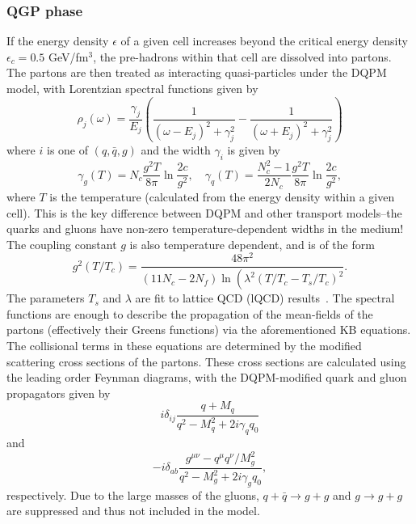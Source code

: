 \subsubsection{QGP phase}
If the energy density $\epsilon$ of a given cell increases beyond the critical energy density $\epsilon_c = 0.5$ GeV/fm$^3$, the pre-hadrons within that cell are dissolved into partons. The partons are then treated as interacting quasi-particles under the DQPM~\cite{DQPM} model, with Lorentzian spectral functions given by
\begin{equation}
\rho_j(\omega)=\frac{\gamma_j}{E_j}\left(\frac{1}{\left(\omega-E_j\right)^2+\gamma_j^2}-\frac{1}{\left(\omega+E_j\right)^2+\gamma_j^2}\right)
\end{equation}
where $i$ is one of $(q, \bar{q}, g)$ and the width $\gamma_i$ is given by
\begin{equation}
\gamma_g(T)=N_c \frac{g^2 T}{8 \pi} \ln \frac{2 c}{g^2}, \quad \gamma_q(T)=\frac{N_c^2-1}{2 N_c} \frac{g^2 T}{8 \pi} \ln \frac{2 c}{g^2},
\end{equation}
where $T$ is the temperature (calculated from the energy density within a given cell). This is the key difference between DQPM and other transport models--the quarks and gluons have non-zero temperature-dependent widths in the medium! The coupling constant $g$ is also temperature dependent, and is of the form
\begin{equation}
    g^2\left(T / T_c\right)=\frac{48 \pi^2}{\left(11 N_c-2 N_f\right) \ln \left(\lambda^2\left(T / T_c-T_s / T_c\right)^2\right.}.
\end{equation}
The parameters $T_s$ and $\lambda$ are fit to lattice QCD (lQCD) results~\cite{DQPM_lQCD}. The spectral functions are enough to describe the propagation of the mean-fields of the partons (effectively their Greens functions) via the aforementioned KB equations. The collisional terms in these equations are determined by the modified scattering cross sections of the partons. These cross sections are calculated using the leading order Feynman diagrams, with the DQPM-modified quark and gluon propagators given by
\begin{equation}
    i \delta_{i j} \frac{q+M_q}{q^2-M_q^2+2 i \gamma_q q_0}
\end{equation}
and
\begin{equation}
    -i \delta_{a b} \frac{g^{\mu \nu}-q^\mu q^\nu / M_g^2}{q^2-M_g^2+2 i \gamma_g q_0},
\end{equation}
respectively. Due to the large masses of the gluons, $q + \bar{q} \rightarrow g + g$ and $g \rightarrow g + g$ are suppressed and thus not included in the model.


